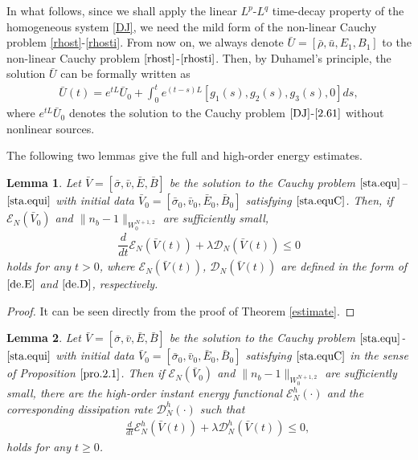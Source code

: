 \documentclass[11pt]{amsart}
\newtheorem{lemma}{Lemma}[section]
\numberwithin{equation}{section}
\begin{document}
In what follows, since we shall apply the linear $L^{p}$-$L^{q}$
time-decay property of the homogeneous system \eqref{DJ}, we need
the mild form of the non-linear Cauchy problem
\eqref{rhost}-\eqref{rhosti}. From now on, we always denote
$\bar{U}=[\bar{\rho},\bar{u},E_{1},B_{1}]$ to the non-linear Cauchy
problem $\eqref{rhost}$-$\eqref{rhosti}$. Then, by Duhamel's
principle, the solution $\bar{U}$ can be formally written as
\begin{eqnarray}\label{sec5.U}
\bar{U}(t)=e^{tL}\bar{U}_{0}+\int_{0}^{t}e^{(t-s)L}[g_{1}(s),g_{2}(s),g_{3}(s),0]d
s,
\end{eqnarray}
where $e^{tL}\bar{U}_{0}$ denotes the solution to the Cauchy problem
$\eqref{DJ}$-$\eqref{2.61}$ without nonlinear sources.

The following  two lemmas give the full and high-order energy
estimates.
\begin{lemma}\label{lem.V}
Let $\bar{V}=[\bar{\sigma},\bar{v},\bar{E},\bar{B}]$ be the solution
to the Cauchy problem $\eqref{sta.equ}$--$ \eqref{sta.equi}$ with
initial data
$\bar{V}_{0}=[\bar{\sigma}_{0},\bar{v}_{0},\bar{E}_{0},\bar{B}_{0}]$
satisfying $\eqref{sta.equC}$. Then, if $\mathcal
{E}_{N}(\bar{V}_{0})$ and $\|n_{b}-1\|_{W_{0}^{N+1,2}}$ are
sufficiently small,
\begin{eqnarray}\label{sec5.ENV0}
\dfrac{d}{dt}\mathcal {E}_{N}(\bar{V}(t))+\lambda \mathcal {D}_{N}(\bar{V}(t))
\leq 0
\end{eqnarray}
holds for any $t>0$, where $\mathcal {E}_{N}(\bar{V}(t))$, $\mathcal
{D}_{N}(\bar{V}(t))$ are defined in the form of $\eqref{de.E}$ and
$\eqref{de.D}$, respectively.
\end{lemma}
\begin{proof}
It can be seen directly from the proof of Theorem \ref{estimate}.
\end{proof}

\begin{lemma}\label{estimate2}
Let $\bar{V}=[\bar{\sigma},\bar{v},\bar{E},\bar{B}]$ be the solution
to the Cauchy problem $\eqref{sta.equ}$-$\eqref{sta.equi}$ with
initial data
$\bar{V}_{0}=[\bar{\sigma}_{0},\bar{v}_{0},\bar{E}_{0},\bar{B}_{0}]$
satisfying $\eqref{sta.equC}$ in the sense of Proposition
$\ref{pro.2.1}$. Then if $ \mathcal {E}_{N}(\bar{V}_{0})$ and
$\|n_{b}-1\|_{W_{0}^{N+1,2}}$ are sufficiently small, there are the
high-order instant energy functional $\mathcal {E}_{N}^{h}(\cdot)$
and the corresponding dissipation rate $\mathcal {D}_{N}^{h}(\cdot)$
such that
\begin{eqnarray}\label{sec5.high}
&& \frac{d}{dt}\mathcal {E}_{N}^{h}(\bar{V}(t))+\lambda\mathcal
{D}^{h}_{N}(\bar{V}(t))\leq 0,
\end{eqnarray}
holds for any $ t \geq 0$.
\end{lemma}
\end{document}
